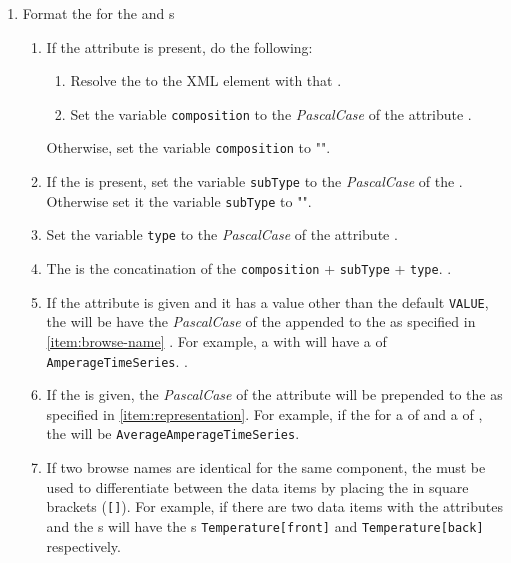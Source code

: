 \begin{enumerate}
\item Format the  for the  and  s
    \begin{enumerate}[after=\vspace{\baselineskip}]
    \setlength\itemsep{1em}
    \item If the  attribute  is present, do the following:
        \begin{enumerate}
        \item Resolve the  to the  XML element with that .
        \item Set the variable \texttt{composition} to the \textit{PascalCase} of the  attribute .
        \end{enumerate}
        Otherwise, set the variable \texttt{composition} to "".
    \item If the  is present, set the variable \texttt{subType} to the \textit{PascalCase} of the . Otherwise set it the variable \texttt{subType} to "".
    \item Set the variable \texttt{type} to the \textit{PascalCase} of the  attribute .
    \item The  is the concatination of the \texttt{composition} + \texttt{subType} + \texttt{type}. \label{item:browse-name}.
    \item If the  attribute is given and it has a value other than the default \texttt{VALUE}, the  will be have the \textit{PascalCase} of the  appended to the   as specified in \ref{item:browse-name} . For example, a  with  will have a  of \texttt{AmperageTimeSeries}. \label{item:representation}.
    \item If the  is given, the \textit{PascalCase} of the  attribute will be prepended to the   as specified in \ref{item:representation}. For example, if the  for a  of  and a  of , the  will be  \texttt{AverageAmperageTimeSeries}. \label{item:statistic}
    \item If two browse names are identical for the same component, the  must be used to differentiate between the data items by placing the  in square brackets (\texttt{[]}). For example, if there are two  data items with the attributes  and  the s will have the s \texttt{Temperature[front]} and \texttt{Temperature[back]} respectively. \label{item:data-item-name}
    \end{enumerate} 


\end{enumerate}
